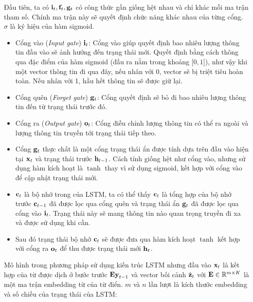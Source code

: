 \documentclass[14pt, a4paper]{article}
\numberwithin{equation}{section}
\numberwithin{algorithm}{section}
\numberwithin{figure}{section}
\numberwithin{dl}{section}
\numberwithin{md}{section}
\numberwithin{bd}{section}
\numberwithin{dn}{section}
\numberwithin{hq}{section}
\begin{document}
    Đầu tiên, ta có $\bold{i}_t, \bold{f}_t, \bold{g}_t$ có công thức gần giống hệt nhau và chỉ khác mỗi ma trận tham số. 
    Chính ma trận này sẽ quyết định chức năng khác nhau của từng cổng.
    $\sigma$ là ký hiệu của hàm sigmoid.

    \begin{itemize}
        \item Cổng vào (\textit{Input gate}) $\bold{i}_t$: Cổng vào giúp quyết định bao nhiêu lượng thông tin đầu vào sẽ ảnh hưởng đến trạng thái mới. 
        Quyết định bằng cách  thông qua đặc điểm của hàm sigmoid (đầu ra nằm trong khoảng $\lbrack 0, 1\rbrack$), như vậy khi một vector thông tin đi qua đây, nếu nhân với 0, vector sẽ bị triệt tiêu hoàn toàn. Nếu nhân với 1, hầu hết thông tin sẽ được giữ lại.
        \item Cổng quên (\textit{Forget gate}) $\bold{g}_t$: Cổng quyết định sẽ bỏ đi bao nhiêu lượng thông tin đến từ trạng thái trước đó.
        \item Cổng ra (\textit{Output gate}) $\bold{o}_t$: Cổng điều chỉnh lượng thông tin có thể ra ngoài và lượng thông tin truyền tới trạng thái tiếp theo.
        \item Cổng $\bold{g}_t$ thực chất là một cổng trạng thái ẩn được tính dựa trên đầu vào hiện tại $\bold{x}_t$ và trạng thái trước $\bold{h}_{t-1}$.
        Cách tính giống hệt như cổng vào, nhưng sử dụng hàm kích hoạt là $\tanh$ thay vì sử dụng sigmoid, kết hợp với cổng vào để cập nhật trạng thái mới.
        \item $\bold{c}_t$ là bộ nhớ trong của LSTM, ta có thể thấy $\bold{c}_t$ là tổng hợp của bộ nhớ trước $\bold{c}_{t-1}$ đã được lọc qua cổng quên và trạng thái ẩn $\bold{g}_t$ đã được lọc qua cổng vào $\bold{i}_t$.
        Trạng thái này sẽ mang thông tin nào quan trọng truyền đi xa và được sử dụng khi cần.
        \item Sau đó trạng thái bộ nhớ $\bold{c}_t$ sẽ được đưa qua hàm kích hoạt $\tanh$ kết hợp với cổng ra $\bold{o}_t$ để thu được trạng thái mới $\bold{h}_t$.
    \end{itemize}

    Mô hình trong phương pháp sử dụng kiến trúc LSTM nhưng đầu vào $\bold{x}_t$ là kết hợp của từ được dịch ở bước trước $\bold{Ey}_{t-1}$ và vector bối cảnh $\hat{\bold{z}}_t$ với $\bold{E} \in \mathbb{R}^{m \times K}$ là một ma trận embedding từ của từ điển.
    $m$ và $n$ lần lượt là kích thước embedding và số chiều của trạng thái của LSTM:
\end{document}
